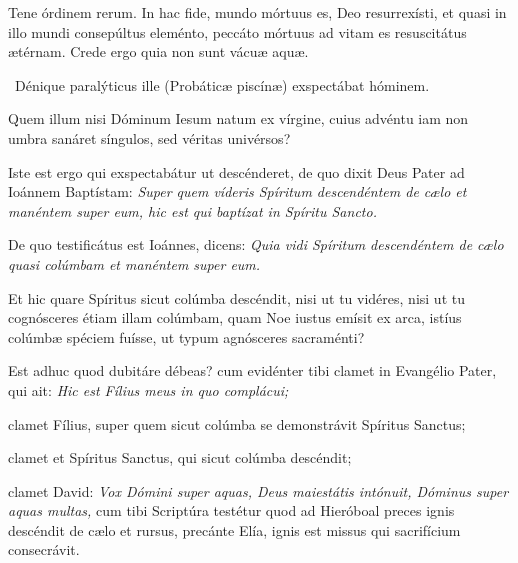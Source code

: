 {\noindent Tene órdinem rerum. In hac fide, mundo mórtuus es, Deo resurrexísti, et quasi in illo mundi consepúltus eleménto, peccáto mórtuus ad vitam es resuscitátus ætérnam. Crede ergo quia non sunt vácuæ aquæ.

\noindent Dénique paralýticus ille (Probáticæ piscínæ) exspectábat hóminem. 

\noindent Quem illum nisi Dóminum Iesum natum ex vírgine, cuius advéntu iam non umbra sanáret síngulos, sed véritas univérsos? 

\noindent Iste est ergo qui exspectabátur ut descénderet, de quo dixit Deus Pater ad Ioánnem Baptístam: \emph{Super quem víderis Spíritum descendéntem de cælo et manéntem super eum, hic est qui baptízat in Spíritu Sancto.} 

\noindent De quo testificátus est Ioánnes, dicens: \emph{Quia vidi Spíritum descendéntem de cælo quasi colúmbam et manéntem super eum.} 

\noindent Et hic quare Spíritus sicut colúmba descéndit, nisi ut tu vidéres, nisi ut tu cognósceres étiam illam colúmbam, quam Noe iustus emísit ex arca, istíus colúmbæ spéciem fuísse, ut typum agnósceres sacraménti?

\noindent Est adhuc quod dubitáre débeas? cum evidénter tibi clamet in Evangélio Pater, qui ait: \emph{Hic est Fílius meus in quo complácui;} 

\noindent clamet Fílius, super quem sicut colúmba se demonstrávit Spíritus Sanctus; 

\noindent clamet et Spíritus Sanctus, qui sicut colúmba descéndit; 

\noindent clamet David: \emph{Vox Dómini super aquas, Deus maiestátis intónuit, Dóminus super aquas multas,} cum tibi Scriptúra testétur quod ad Hieróboal preces ignis descéndit de cælo et rursus, precánte Elía, ignis est missus qui sacrifícium consecrávit.

}

